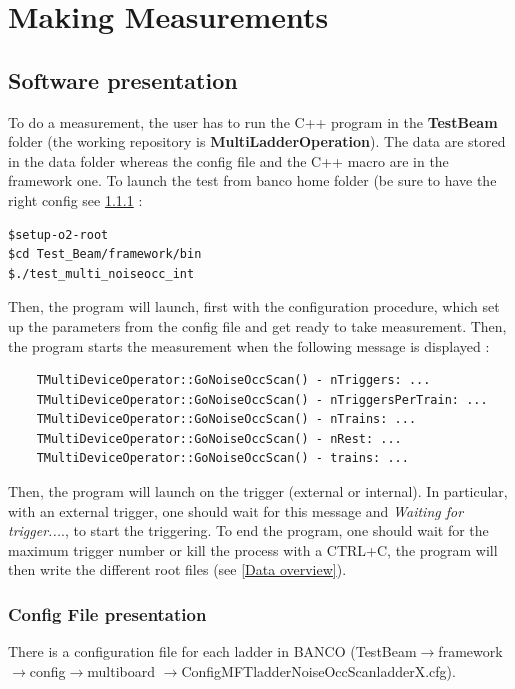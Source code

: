 \documentclass[12pt,oneside,a4]{article}
\begin{document}
\section{Making Measurements}
    \subsection{Software presentation}
To do a measurement, the user has to run the C++ program in the \textbf{Test\textunderscore Beam} folder (the working repository is \textbf{MultiLadderOperation}). The data are stored in the data folder whereas the config file and the C++ macro are in the framework one.
To launch the test from banco home folder (be sure to have the right config see \ref{Config File presentation} :
\begin{verbatim}
$setup-o2-root
$cd Test_Beam/framework/bin
$./test_multi_noiseocc_int
\end{verbatim}

Then, the program will launch, first with the configuration procedure, which set up the parameters from the config file and get ready to take measurement. Then, the program starts the measurement when the following message is displayed : 
\begin{verbatim}
    TMultiDeviceOperator::GoNoiseOccScan() - nTriggers: ...
    TMultiDeviceOperator::GoNoiseOccScan() - nTriggersPerTrain: ...
    TMultiDeviceOperator::GoNoiseOccScan() - nTrains: ...
    TMultiDeviceOperator::GoNoiseOccScan() - nRest: ...
    TMultiDeviceOperator::GoNoiseOccScan() - trains: ...
\end{verbatim}

Then, the program will launch on the trigger (external or internal). In particular, with an external trigger, one should wait for this message and \textit{Waiting for trigger...}., to start the triggering. 
To end the program, one should wait for the maximum trigger number or kill the process with a CTRL+C, the program will then write the different root files (see \ref{Data overview}).


        \subsubsection{Config File presentation}\label{Config File presentation}
There is a configuration file for each ladder in BANCO (Test\textunderscore Beam$\rightarrow$framework$\rightarrow$config$\rightarrow$multiboard
$\rightarrow$ConfigMFTladder\textunderscore NoiseOccScan\textunderscore ladderX.cfg). 
\end{document}
